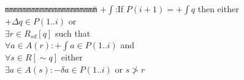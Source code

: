 
\begin{tabbing}
{\tt mmm}\={\tt mmmmmm}\={\tt mmmm}\={\tt mmmm}\={\tt mmmm}\=\kill
\>$+\int$:\>If $P(i + 1) = + \int q$ then either \\
\>\>$+\Delta q \in P(1..i)$ or \\
\>\>\>$\exists r \in R_{sd}[q]$ such that \\
\>\>\>\>$\forall a \in A(r): + \int a \in P(1..i)$ and \\
\>\>\>\>$\forall s \in R[\sim q]$ either \\
\>\>\>\>\>$\exists a \in A(s): - \delta a \in P(1..i)$ or $s \not> r$
\end{tabbing}
